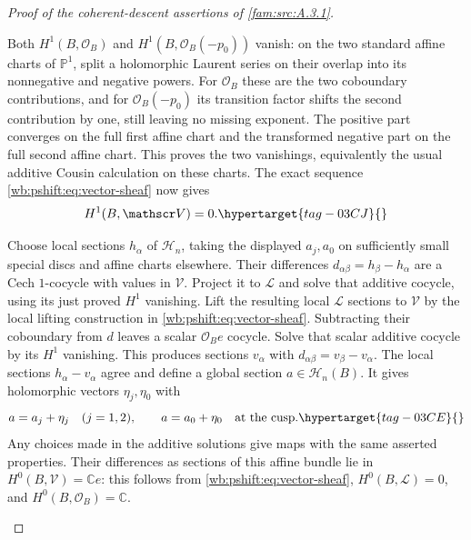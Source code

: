 \begin{proof}[Proof of the coherent-descent assertions of \cref{fam:src:A.3.1}]
\begin{enumerate}[label=\arabic*.,leftmargin=*]
Both $H^1(B,\mathcal O_B)$ and
$H^1(B,\mathcal O_B(-p_0))$ vanish: on the two standard affine
charts of $\mathbb P^1$, split a holomorphic Laurent series on
their overlap into its nonnegative and negative powers. For
$\mathcal O_B$ these are the two coboundary contributions, and
for $\mathcal O_B(-p_0)$ its transition factor shifts the second
contribution by one, still leaving no missing exponent. The positive
part converges on the full first affine chart and the transformed
negative part on the full second affine chart. This proves the two
vanishings, equivalently the usual additive Cousin calculation on
these charts. The exact sequence \eqref{wb:pshift:eq:vector-sheaf} now gives
\begin{equation}
                             H^1(B,\mathscr V)=0.
 \hypertarget{tag-03CJ}{}\label{wb:pshift:eq:no-analytic-obstruction}
\end{equation}

Choose
local sections $h_\alpha$ of $\mathscr H_n$, taking the displayed
$a_j,a_0$ on sufficiently small special discs and affine charts
elsewhere. Their differences $d_{\alpha\beta}=h_\beta-h_\alpha$
are a Cech $1$-cocycle with values in $\mathscr V$. Project it to
$\mathcal L$ and solve that additive cocycle, using its just proved
$H^1$ vanishing. Lift the resulting local $\mathcal L$ sections to
$\mathscr V$ by the local lifting construction in \eqref{wb:pshift:eq:vector-sheaf}. Subtracting
their coboundary from $d$ leaves a scalar $\mathcal O_Be$ cocycle.
Solve that scalar additive cocycle by its $H^1$ vanishing. This
produces sections $v_\alpha$ with
$d_{\alpha\beta}=v_\beta-v_\alpha$. The local sections
$h_\alpha-v_\alpha$ agree and define a global section
$a\in\mathscr H_n(B)$. It gives holomorphic vectors $\eta_j,\eta_0$ with
\begin{equation}
 a=a_j+\eta_j\quad(j=1,2),\qquad a=a_0+\eta_0
                              \quad\hbox{at the cusp}.
 \hypertarget{tag-03CE}{}\label{wb:pshift:eq:global-correction}
\end{equation}
Any choices made in the additive solutions give maps with the same
asserted properties. Their differences as sections of this affine
bundle lie in $H^0(B,\mathscr V)=\mathbb C e$: this follows from
\eqref{wb:pshift:eq:vector-sheaf}, $H^0(B,\mathcal L)=0$, and $H^0(B,\mathcal O_B)=\mathbb C$.


\end{enumerate}
\end{proof}
